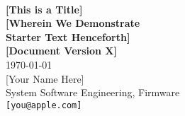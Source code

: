 
\begin{titlepage}

\setlength{\parindent}{0in}

{
	\fontsize{32}{32}\selectfont
	\textcolor{AppleGray}{\AppleLogo}
}
\\[0.25in]

{
	\fontsize{32}{32}\selectfont
	\textcolor{SmokeyDarkBlue}{\bfseries [This is a Title]} \\[0.3ex]
	\textbf{[Wherein We Demonstrate} \\[0.5ex]
	\textbf{Starter Text Henceforth]}
}
\\[0.25in]

\textbf{[Document Version X]} \\
\today
\\[0.25in]

[Your Name Here] \\
System Software Engineering, Firmware \\
\texttt{[you@apple.com]}

\vfill

\begin{center}
\end{center}

\end{titlepage}
